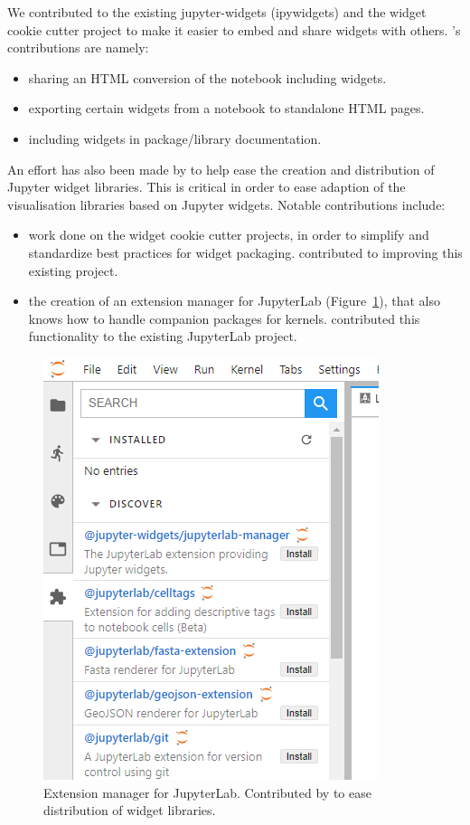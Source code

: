 \documentclass{deliverablereport}
\begin{document}
We contributed to the existing jupyter-widgets (ipywidgets) and the widget cookie
cutter project to make it easier to embed and share widgets with
others. \ODK's contributions are namely:

\begin{itemize}
\item sharing an HTML conversion of the notebook including widgets.
\item exporting certain widgets from a notebook to standalone HTML pages.
\item including widgets in package/library documentation.
\end{itemize}

An effort has also been made by \ODK to help ease the creation and distribution of Jupyter widget libraries. This is critical in order to ease adaption of the visualisation libraries based on Jupyter widgets. Notable contributions include:
\begin{itemize}
\item work done on the widget cookie cutter projects, in order to simplify and standardize best practices for widget packaging. \ODK contributed to improving this existing project.
\item the creation of an extension manager for JupyterLab (Figure~\ref{fig:lab-extmngr}), that also knows how to handle companion packages for kernels. \ODK contributed this functionality to the existing JupyterLab project.
\end{itemize}

\begin{figure}
  \centering
  \includegraphics[scale=0.6]{lab-extmngr.png}
  \caption{Extension manager for JupyterLab. Contributed by \ODK to ease distribution of widget libraries.}
  \label{fig:lab-extmngr}
\end{figure}
\end{document}
